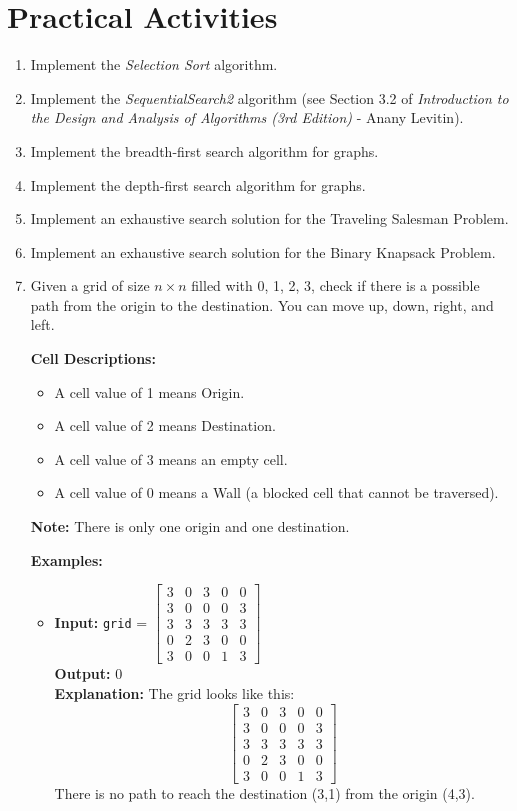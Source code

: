 \documentclass{article}
\begin{document}
\section{Practical Activities}

\begin{enumerate}
    \item Implement the \textit{Selection Sort} algorithm.
    \item Implement the \textit{SequentialSearch2} algorithm (see Section 3.2 of \textit{Introduction to the Design and Analysis of Algorithms (3rd Edition)} - Anany Levitin).
    \item Implement the breadth-first search algorithm for graphs.
    \item Implement the depth-first search algorithm for graphs.
    \item Implement an exhaustive search solution for the Traveling Salesman Problem.
    \item Implement an exhaustive search solution for the Binary Knapsack Problem.
    \item Given a grid of size \( n \times n \) filled with 0, 1, 2, 3, check if there is a possible path from the origin to the destination. You can move up, down, right, and left.

    \textbf{Cell Descriptions:}
    \begin{itemize}
        \item A cell value of 1 means Origin.
        \item A cell value of 2 means Destination.
        \item A cell value of 3 means an empty cell.
        \item A cell value of 0 means a Wall (a blocked cell that cannot be traversed).
    \end{itemize}
    
    \textbf{Note:} There is only one origin and one destination.
    
    \textbf{Examples:}
    \begin{itemize}
        \item \textbf{Input:} \texttt{grid} = \(\begin{bmatrix}3 & 0 & 3 & 0 & 0\\3 & 0 & 0 & 0 & 3\\3 & 3 & 3 & 3 & 3\\0 & 2 & 3 & 0 & 0\\3 & 0 & 0 & 1 & 3\end{bmatrix}\) \\
        \textbf{Output:} 0 \\
        \textbf{Explanation:} The grid looks like this: \\
        \[
        \begin{bmatrix}
        3 & 0 & 3 & 0 & 0 \\
        3 & 0 & 0 & 0 & 3 \\
        3 & 3 & 3 & 3 & 3 \\
        0 & 2 & 3 & 0 & 0 \\
        3 & 0 & 0 & 1 & 3
        \end{bmatrix}
        \]
        There is no path to reach the destination (3,1) from the origin (4,3).
        

\end{itemize}
\end{enumerate}
\end{document}
